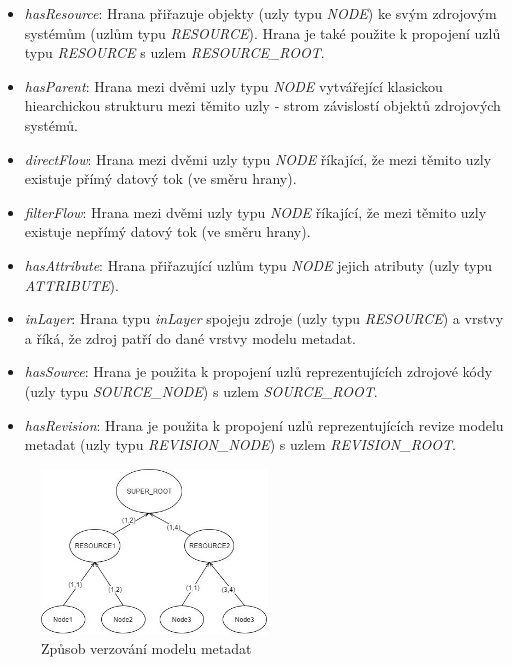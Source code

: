  \begin{itemize}
	\item{\textit{hasResource}}: Hrana přiřazuje objekty (uzly typu \textit{NODE}) ke svým zdrojovým systémům (uzlům typu \textit{RESOURCE}). Hrana je také použite k propojení uzlů typu \textit{RESOURCE} s uzlem \textit{RESOURCE\_ROOT}.
	\item{\textit{hasParent}}: Hrana mezi dvěmi uzly typu \textit{NODE} vytvářející klasickou hiearchickou strukturu mezi těmito uzly - strom závislostí objektů zdrojových systémů. 
	\item{\textit{directFlow}}: Hrana mezi dvěmi uzly typu \textit{NODE} říkající, že mezi těmito uzly existuje přímý datový tok (ve směru hrany).
	\item{\textit{filterFlow}}: Hrana mezi dvěmi uzly typu \textit{NODE} říkající, že mezi těmito uzly existuje nepřímý datový tok (ve směru hrany).
	\item{\textit{hasAttribute}}: Hrana přiřazující uzlům typu \textit{NODE} jejich atributy (uzly typu \textit{ATTRIBUTE}).
	\item{\textit{inLayer}}: Hrana typu \textit{inLayer} spojeju zdroje (uzly typu \textit{RESOURCE}) a vrstvy a říká, že zdroj patří do dané vrstvy modelu metadat. 
	\item{\textit{hasSource}}: Hrana je použita k propojení uzlů reprezentujících zdrojové kódy (uzly typu \textit{SOURCE\_NODE}) s uzlem \textit{SOURCE\_ROOT}.
	\item{\textit{hasRevision}}: Hrana je použita k propojení uzlů reprezentujících revize modelu metadat (uzly typu \textit{REVISION\_NODE}) s uzlem \textit{REVISION\_ROOT}.
\end{itemize}

\begin{figure}
\begin{center}
\includegraphics[width=6cm]{figures/model_revisions}
\caption{Způsob verzování modelu metadat}
\label{fig:ana-model-rev}
\end{center}
\end{figure}

